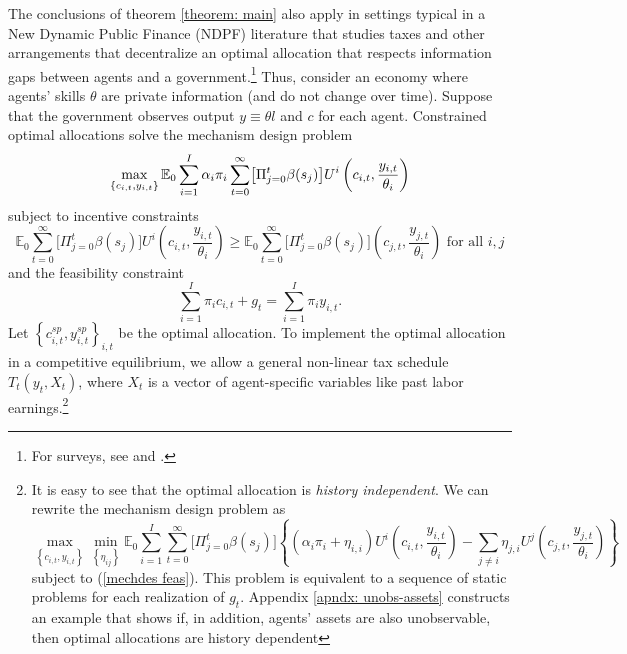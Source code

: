 \documentclass[thmsb,11pt]{article}
\begin{document}
The conclusions  of theorem \ref{theorem: main} also apply in settings typical in  a New Dynamic Public Finance (NDPF)  literature that studies taxes and other arrangements that  decentralize an optimal allocation that respects information gaps between agents and a government.\footnote{%
For surveys, see \citet{golosov2007new} and \cite{kocherlakota2010new}.}
Thus, consider an economy where agents' skills $\theta$ are private information (and do not change over time).  Suppose
that the government observes output $y\equiv \theta l$ and $c$ for each
agent. Constrained optimal allocations solve the mechanism design problem
\begin{equation}
\max_{\left \{ c_{i,t},y_{i,t}\right \} }\mathbb{E}_{0}\sum_{i=1}^{I}\alpha
_{i}\pi _{i}\sum_{t=0}^{\infty } \bigl[\Pi_{j=0}^t \beta(s_j)\bigr] U^{i}\left( c_{i,t},\frac{y_{i,t}}{%
\theta _{i}}\right)  \label{mechdes max}
\end{equation}%
subject to incentive constraints%
\begin{equation}
\mathbb{E}_{0}\sum_{t=0}^{\infty }\bigl[\Pi_{j=0}^t \beta(s_j)\bigr]U^{i}\left( c_{i,t},\frac{y_{i,t}%
}{\theta _{i}}\right) \geq \mathbb{E}_{0}\sum_{t=0}^{\infty }\bigl[\Pi_{j=0}^t \beta(s_j)\bigr]\left( c_{j,t},\frac{y_{j,t}}{\theta _{i}}\right) \text{ for all }%
i,j  \label{mechdes IC}
\end{equation}%
and the feasibility constraint%
\begin{equation}
\sum_{i=1}^{I}\pi _{i}c_{i,t}+g_{t}=\sum_{i=1}^{I}\pi _{i}y_{i,t}.
\label{mechdes feas}
\end{equation}%
Let $\left \{ c_{i,t}^{sp},y_{i,t}^{sp}\right \} _{i,t}$ be the optimal allocation. To implement the optimal allocation
in a competitive equilibrium, we allow a general
non-linear tax schedule $T_{t}\left( y_{t},X_{t}\right) $, where $X_{t}$ is a vector
of  agent-specific variables like past labor earnings.\footnote{It is easy to see that the optimal allocation is \emph{history independent}. We can rewrite the mechanism design problem as
\begin{equation*}
\max_{\left \{ c_{i,t},y_{i,t}\right \} }\min_{\left \{ \eta _{ij}\right \} }%
\mathbb{E}_{0}\sum_{i=1}^{I}\sum_{t=0}^{\infty } \bigl[\Pi_{j=0}^t \beta(s_j)\bigr]\left\{\left( \alpha _{i}\pi _{i}+\eta
_{i,i}\right) U^{i}\left( c_{i,t},\frac{y_{i,t}}{\theta _{i}}\right)
-\sum_{j\neq i}\eta _{j,i}U^{j}\left( c_{j,t},\frac{y_{j,t}}{\theta _{i}}%
\right)\right\} 
\end{equation*}%
subject to (\ref{mechdes feas}). This problem is equivalent to a sequence of
static problems for each realization of $g_{t}.$
Appendix \ref{apndx: unobs-assets} constructs an example that shows if, in addition, agents' assets are also unobservable, then optimal allocations are history dependent}
\end{document}
